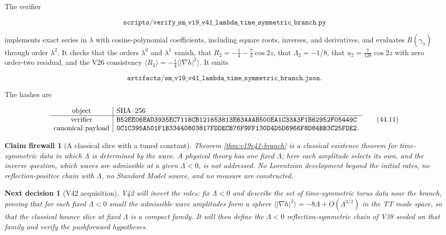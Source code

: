 \documentclass[11pt]{article}
\newtheorem{firewall}[theorem]{Claim firewall}
\newtheorem{decision}[theorem]{Next decision}
\theoremstyle{remark}
\begin{document}
The verifier

\[
 \texttt{scripts/verify\_sm\_v19\_v41\_lambda\_time\_symmetric\_branch.py}
                                                                    \tag{44.9}
\]

implements exact series in \(\lambda\) with cosine-polynomial
coefficients, including square roots, inverses, and derivatives, and
evaluates \(R(\gamma_\lambda)\) through order \(\lambda^2\).  It checks
that the orders \(\lambda^0\) and \(\lambda^1\) vanish, that
\(R_2=-\tfrac14-\tfrac74\cos2z\), that \(\Lambda_2=-1/8\), that
\(u_2=\tfrac7{128}\cos2z\) with zero order-two residual, and the V26
consistency \(\langle R_2\rangle=-\tfrac14\langle|\nabla h|^2\rangle\).
It emits

\[
 \texttt{artifacts/sm\_v19\_v41\_lambda\_time\_symmetric\_branch.json}.
                                                                    \tag{44.10}
\]

The hashes are

\[
\begin{array}{c|l}
\hbox{object}&\hbox{SHA--256}\\ \hline
\hbox{verifier}&
\texttt{B52EE06EAD3935EC7118CB121653813E63AAAB500EA1C33A3F1B62952F05449C}\\
\hbox{canonical payload}&
\texttt{0C1C395A501F1B33440803817FDDECB76F9FF130D4D5D6966F8D84BB3C25FDE2}.
\end{array}                                                     \tag{44.11}
\]

\begin{firewall}[A classical slice with a tuned constant]
\label{fire:v19v41}
Theorem \ref{thm:v19v41-branch} is a classical existence theorem for
time-symmetric data in which \(\Lambda\) is determined by the wave.  A
physical theory has one fixed \(\Lambda\); here each amplitude selects
its own, and the inverse question, which waves are admissible at a
given \(\Lambda<0\), is not addressed.  No Lorentzian development beyond
the initial rates, no reflection-positive chain with \(\Lambda\), no
Standard Model source, and no measure are constructed.
\end{firewall}

\begin{decision}[V42 acquisition]
\label{dec:v19v41-next}
V42 will invert the roles: fix \(\Lambda<0\) and describe the set of
time-symmetric torus data near the branch, proving that for each fixed
\(\Lambda<0\) small the admissible wave amplitudes form a sphere
\(\langle|\nabla h|^2\rangle=-8\Lambda+O(\Lambda^{3/2})\) in the TT
mode space, so that the classical bounce slice at fixed \(\Lambda\) is
a compact family.  It will then define the \(\Lambda<0\)
reflection-symmetric chain of V38 seeded on that family and verify the
pushforward hypotheses.
\end{decision}
\end{document}
